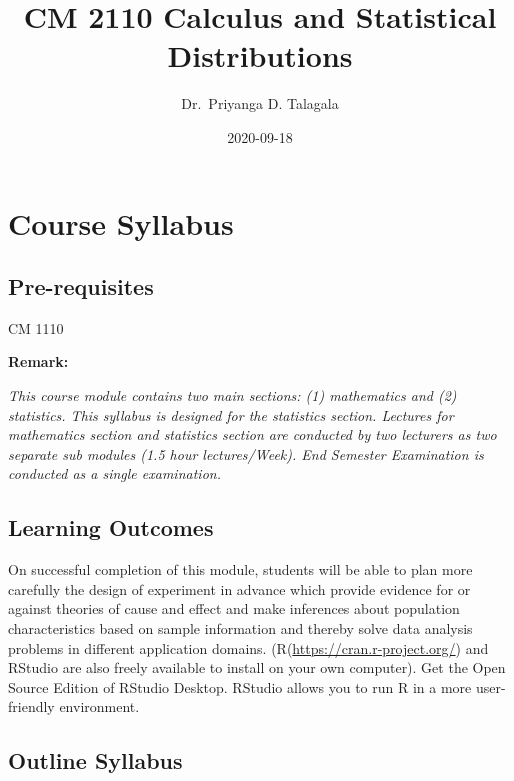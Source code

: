 \documentclass[]{book}
\title{CM 2110 Calculus and Statistical Distributions}
\author{Dr.~Priyanga D. Talagala}
\date{2020-09-18}
\begin{document}
\maketitle

{
\setcounter{tocdepth}{1}
\tableofcontents
}
\hypertarget{course-syllabus}{%
\chapter*{Course Syllabus}\label{course-syllabus}}

\hypertarget{pre-requisites}{%
\section*{Pre-requisites}\label{pre-requisites}}

CM 1110

\textbf{Remark:}

\emph{This course module contains two main sections: (1) mathematics and (2) statistics. This syllabus is designed for the statistics section. Lectures for mathematics section and statistics section are conducted by two lecturers as two separate sub modules (1.5 hour lectures/Week). End Semester Examination is conducted as a single examination.}

\hypertarget{learning-outcomes}{%
\section*{Learning Outcomes}\label{learning-outcomes}}

On successful completion of this module, students will be able to plan more carefully the design of experiment in advance which provide evidence for or against theories of cause and effect and make inferences about population characteristics based on sample information and thereby solve data analysis problems in different application domains. (R(\url{https://cran.r-project.org/}) and RStudio are also freely available to install on your own computer). Get the Open Source Edition of RStudio Desktop. RStudio allows you to run R in a more user-friendly environment.

\hypertarget{outline-syllabus}{%
\section*{Outline Syllabus}\label{outline-syllabus}}
\end{document}
